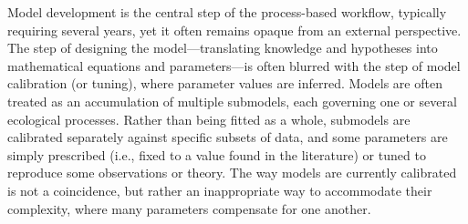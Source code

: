 \documentclass[11pt]{article}
\begin{document}
\begin{tcolorbox}
{\begin{multicols}{2}
\begin{minipage}[t]{\linewidth}
    \vspace*{1mm}
\end{minipage}

\noindent %
Model development is the central step of the process-based workflow, typically requiring several years, yet it often remains opaque from an external perspective. The step of designing the model---translating knowledge and hypotheses into mathematical equations and parameters---is often blurred with the step of model calibration (or tuning), where parameter values are inferred. Models are often treated as an accumulation of multiple submodels, each governing one or several ecological processes. Rather than being fitted as a whole, submodels are calibrated separately against specific subsets of data, and some parameters are simply prescribed (i.e., fixed to a value found in the literature) or tuned to reproduce some observations or theory. The way models are currently calibrated is not a coincidence, but rather an inappropriate way to accommodate their complexity, where many parameters compensate for one another. %

\vfill

\end{multicols}}


\end{tcolorbox}
\end{document}
